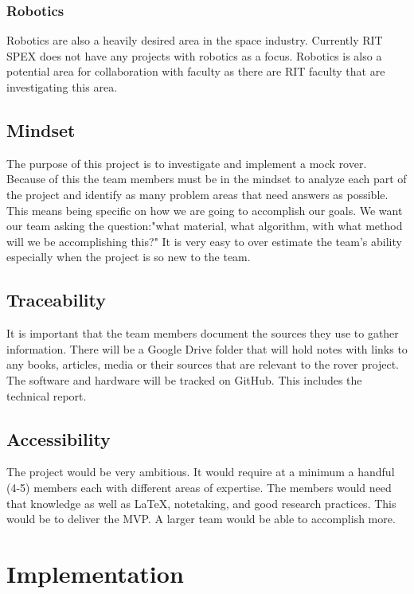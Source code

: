 \documentclass[conference]{IEEEtran} %
\begin{document}
\subsubsection{Robotics}
\label{robotics}
Robotics are also a heavily desired area in the space industry. Currently RIT SPEX does not have any projects with robotics as a focus. Robotics is also a potential area for collaboration with faculty as there are RIT faculty that are investigating this area. 


\subsection{Mindset}
\label{subsec:mindset}
The purpose of this project is to investigate and implement a mock rover.
Because of this the team members must be in the mindset to analyze each part of the project and identify as many problem areas that need answers as possible. 
This means being specific on how we are going to accomplish our goals.
We want our team asking the question:"what material, what algorithm, with what method will we be accomplishing this?"
It is very easy to over estimate the team's ability especially when the project is so new to the team.

\subsection{Traceability}
\label{subsec:traceability}

It is important that the team members document the sources they use to gather information. 
There will be a Google Drive folder that will hold notes with links to any books, articles, media or their sources that are relevant to the rover project. 
The software and hardware will be tracked on GitHub. 
This includes the technical report.

\subsection{Accessibility}
\label{subsec:plug-n-play}

The project would be very ambitious. It would require at a minimum a handful (4-5) members each with different areas of expertise. 
The members would need that knowledge as well as \LaTeX{}, notetaking, and good research practices. 
This would be to deliver the MVP.
A larger team would be able to accomplish more.  

\section{Implementation}
\label{sec:implementation}
\end{document}

